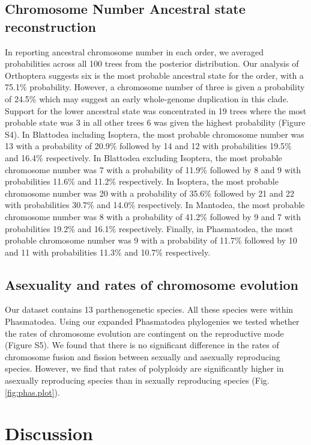 \documentclass[]{rsos}%
\begin{document}
\subsection{Chromosome Number Ancestral state reconstruction}
In reporting ancestral chromosome number in each order, we averaged probabilities across all 100 trees from the posterior distribution. 
Our analysis of Orthoptera suggests six is the most probable ancestral state for the order, with a 75.1\% probability.
However, a chromosome number of three is given a probability of 24.5\% which may suggest an early whole-genome duplication in this clade.
Support for the lower ancestral state was concentrated in 19 trees where the most probable state was 3 in all other trees 6 was given the highest probability (Figure S4). 
In Blattodea including Isoptera, the most probable chromosome number was 13 with a probability of 20.9\% followed by 14 and 12 with probabilities 19.5\% and 16.4\% respectively. 
In Blattodea excluding Isoptera, the most probable chromosome number was 7 with a probability of 11.9\% followed by 8 and 9 with probabilities 11.6\% and 11.2\% respectively.
In Isoptera, the most probable chromosome number was 20 with a probability of 35.6\% followed by 21 and 22 with probabilities 30.7\% and 14.0\% respectively.
In Mantodea, the most probable chromosome number was 8 with a probability of 41.2\% followed by 9 and 7 with probabilities 19.2\% and 16.1\% respectively.
Finally, in Phasmatodea, the most probable chromosome number was 9 with a probability of 11.7\% followed by 10 and 11 with probabilities 11.3\% and 10.7\% respectively.

\subsection{Asexuality and rates of chromosome evolution}
Our dataset contains 13 parthenogenetic species.
All these species were within Phasmatodea.
Using our expanded Phasmatodea phylogenies we tested whether the rates of chromosome evolution are contingent on the reproductive mode (Figure S5).
We found that there is no significant difference in the rates of chromosome fusion and fission between sexually and asexually reproducing species.
However, we find that rates of polyploidy are significantly higher in asexually reproducing species than in sexually reproducing species (Fig. \ref{fig:phas.plot}).

\section{Discussion}
\end{document}
